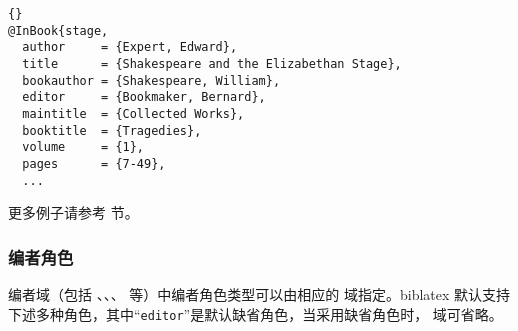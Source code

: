\begin{lstlisting}[style=bibtex]{}
@InBook{stage,
  author     = {Expert, Edward},
  title      = {Shakespeare and the Elizabethan Stage},
  bookauthor = {Shakespeare, William},
  editor     = {Bookmaker, Bernard},
  maintitle  = {Collected Works},
  booktitle  = {Tragedies},
  volume     = {1},
  pages      = {7-49},
  ...
\end{lstlisting}
%
更多例子请参考  节。

\subsubsection{编者角色}
\label{bib:use:edr}

编者域（包括 、、、 等）中编者角色类型可以由相应的 域指定。biblatex 默认支持下述多种角色，其中“\texttt{editor}”是默认缺省角色，当采用缺省角色时， 域可省略。

